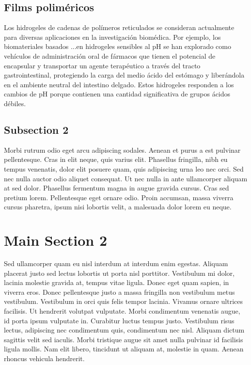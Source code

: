 \subsection{Films poliméricos}

Los hidrogeles de cadenas de polímeros reticulados se consideran actualmente para diversas aplicaciones en la investigación biomédica.%
Por ejemplo, los biomateriales basados ...en hidrogeles sensibles al pH se han explorado como vehículos de administración oral de fármacos que tienen el potencial de encapsular y transportar un agente terapéutico a través del tracto gastrointestinal, protegiendo la carga del medio ácido del estómago y liberándola en el ambiente neutral del intestino delgado.
Estos hidrogeles responden a los cambios de pH porque contienen una cantidad significativa de grupos ácidos débiles.

\subsection{Subsection 2}
Morbi rutrum odio eget arcu adipiscing sodales. Aenean et purus a est pulvinar pellentesque. Cras in elit neque, quis varius elit. Phasellus fringilla, nibh eu tempus venenatis, dolor elit posuere quam, quis adipiscing urna leo nec orci. Sed nec nulla auctor odio aliquet consequat. Ut nec nulla in ante ullamcorper aliquam at sed dolor. Phasellus fermentum magna in augue gravida cursus. Cras sed pretium lorem. Pellentesque eget ornare odio. Proin accumsan, massa viverra cursus pharetra, ipsum nisi lobortis velit, a malesuada dolor lorem eu neque.


\section{Main Section 2}

Sed ullamcorper quam eu nisl interdum at interdum enim egestas. Aliquam placerat justo sed lectus lobortis ut porta nisl porttitor. Vestibulum mi dolor, lacinia molestie gravida at, tempus vitae ligula. Donec eget quam sapien, in viverra eros. Donec pellentesque justo a massa fringilla non vestibulum metus vestibulum. Vestibulum in orci quis felis tempor lacinia. Vivamus ornare ultrices facilisis. Ut hendrerit volutpat vulputate. Morbi condimentum venenatis augue, id porta ipsum vulputate in. Curabitur luctus tempus justo. Vestibulum risus lectus, adipiscing nec condimentum quis, condimentum nec nisl. Aliquam dictum sagittis velit sed iaculis. Morbi tristique augue sit amet nulla pulvinar id facilisis ligula mollis. Nam elit libero, tincidunt ut aliquam at, molestie in quam. Aenean rhoncus vehicula hendrerit.




